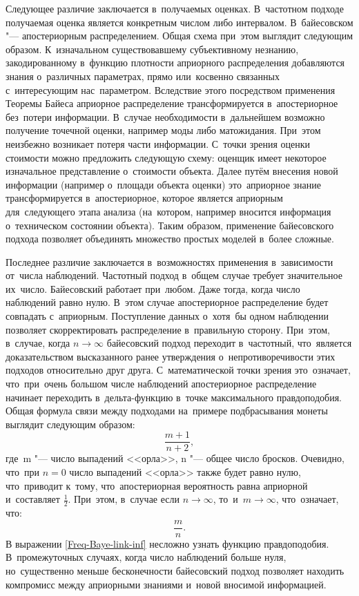 \documentclass[]{scrartcl}
\begin{document}
Следующее различие заключается в~получаемых оценках. В~частотном подходе получаемая оценка является конкретным числом либо интервалом. В~байесовском "--- апостериорным распределением. Общая схема при~этом выглядит следующим образом. К~изначальном существовавшему субъективному незнанию, закодированному в~функцию плотности априорного распределения добавляются знания о~различных параметрах, прямо или~косвенно связанных с~интересующим нас~параметром. Вследствие этого посредством применения Теоремы Байеса априорное распределение трансформируется в~апостериорное без~потери информации. В~случае необходимости в~дальнейшем возможно получение точечной оценки, например моды либо матожидания. При~этом неизбежно возникает потеря части информации. С~точки зрения оценки стоимости можно предложить следующую схему: оценщик имеет некоторое изначальное представление о~стоимости объекта. Далее путём внесения новой информации (например о~площади объекта оценки) это~априорное знание трансформируется в~апостериорное, которое является априорным для~следующего этапа анализа (на~котором, например вносится информация о~техническом состоянии объекта). Таким образом, применение байесовского подхода позволяет объединять множество простых моделей в~более сложные.

Последнее различие заключается в~возможностях применения в~зависимости от~числа наблюдений. Частотный подход в~общем случае требует значительное их~число. Байесовский работает при~любом. Даже тогда, когда число наблюдений равно нулю. В~этом случае апостериорное распределение будет совпадать с~априорным. Поступление данных о~хотя~бы одном наблюдении позволяет скорректировать распределение в~правильную сторону. При~этом, в~случае, когда $n\longrightarrow \infty$ байесовский подход переходит в~частотный, что~является доказательством высказанного ранее утверждения о~непротиворечивости этих подходов относительно друг друга. С~математической точки зрения это~означает, что~при~очень большом числе наблюдений апостериорное распределение начинает переходить в~дельта-функцию в~точке максимального правдоподобия. Общая формула связи между подходами на~примере подбрасывания монеты выглядит следующим образом:
\begin{equation}\label{Freq-Baye-link}
\frac{m+1}{n+2},
\end{equation}
где~m "--- число выпадений <<орла>>,
n "--- общее число бросков.
Очевидно, что~при $n = 0$ число выпадений <<орла>> также будет равно нулю, что~приводит к~тому, что~апостериорная вероятность равна априорной и~составляет $\frac{1}{2}$. При~этом, в~случае если $n \longrightarrow \infty$, то~и~$m \longrightarrow \infty$, что~означает, что: 
\begin{equation}\label{Freq-Baye-link-inf}
\frac{m}{n}.
\end{equation}
В выражении \ref{Freq-Baye-link-inf} несложно узнать функцию правдоподобия. В~промежуточных случаях, когда число наблюдений больше нуля, но~существенно меньше бесконечности байесовский подход позволяет находить компромисс между априорными знаниями и~новой вносимой информацией.	
\end{document}
